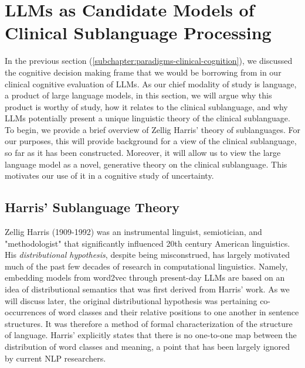  
\section{LLMs as Candidate Models of Clinical Sublanguage Processing}
In the previous section (\ref{subchapter:paradigms-clinical-cognition}), we discussed the cognitive decision making frame that we would be borrowing from in our clinical cognitive evaluation of LLMs. As our chief modality of study is language, a product of large language models, in this section, we will argue why this product is worthy of study, how it relates to the clinical sublanguage, and why LLMs potentially present a unique linguistic theory of the clinical sublanguage. To begin, we provide a brief overview of Zellig Harris' theory of sublanguages. For our purposes, this will provide background for a view of the clinical sublanguage, so far as it has been constructed. Moreover, it will allow us to view the large language model as a novel, generative theory on the clinical sublanguage. This motivates our use of it in a cognitive study of uncertainty. 

\subsection{Harris' Sublanguage Theory}
Zellig Harris (1909-1992) was an instrumental linguist, semiotician, and "methodologist" \cite{nevinZelligHarrisAppreciation} that significantly influenced 20th century American linguistics. His \emph{distributional hypothesis}, despite being misconstrued, has largely motivated much of the past few decades of research in computational linguistics. Namely, embedding models from word2vec through present-day LLMs are based on an idea of distributional semantics that was first derived from Harris' work. As we will discuss later, the original distributional hypothesis was pertaining co-occurrences of word classes and their relative positions to one another in sentence structures. It was therefore a method of formal characterization of the structure of language. Harris' explicitly states that there is no one-to-one map between the distribution of word classes and meaning, a point that has been largely ignored by current NLP researchers. 

